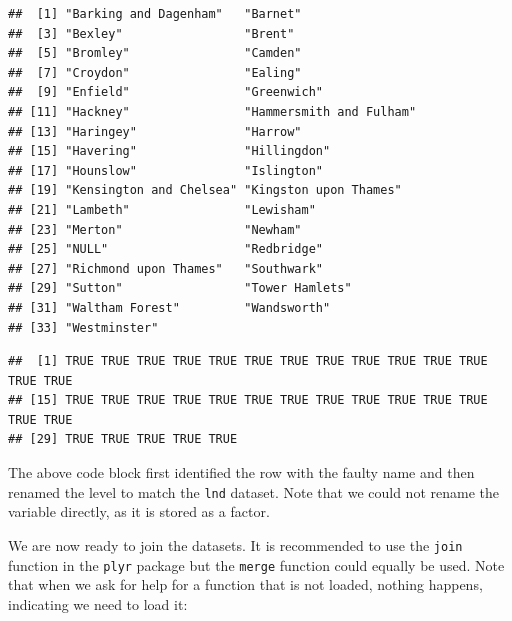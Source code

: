 \documentclass[]{article}
\newenvironment{Shaded}{}{}
\newcommand{\KeywordTok}[1]{\textcolor[rgb]{0.00,0.44,0.13}{\textbf{{#1}}}}
\newcommand{\DecValTok}[1]{\textcolor[rgb]{0.25,0.63,0.44}{{#1}}}
\newcommand{\StringTok}[1]{\textcolor[rgb]{0.25,0.44,0.63}{{#1}}}
\newcommand{\CommentTok}[1]{\textcolor[rgb]{0.38,0.63,0.69}{\textit{{#1}}}}
\newcommand{\NormalTok}[1]{{#1}}
\begin{document}
\begin{verbatim}
##  [1] "Barking and Dagenham"   "Barnet"                
##  [3] "Bexley"                 "Brent"                 
##  [5] "Bromley"                "Camden"                
##  [7] "Croydon"                "Ealing"                
##  [9] "Enfield"                "Greenwich"             
## [11] "Hackney"                "Hammersmith and Fulham"
## [13] "Haringey"               "Harrow"                
## [15] "Havering"               "Hillingdon"            
## [17] "Hounslow"               "Islington"             
## [19] "Kensington and Chelsea" "Kingston upon Thames"  
## [21] "Lambeth"                "Lewisham"              
## [23] "Merton"                 "Newham"                
## [25] "NULL"                   "Redbridge"             
## [27] "Richmond upon Thames"   "Southwark"             
## [29] "Sutton"                 "Tower Hamlets"         
## [31] "Waltham Forest"         "Wandsworth"            
## [33] "Westminster"
\end{verbatim}

\begin{Shaded}
\end{Shaded}

\begin{verbatim}
##  [1] TRUE TRUE TRUE TRUE TRUE TRUE TRUE TRUE TRUE TRUE TRUE TRUE TRUE TRUE
## [15] TRUE TRUE TRUE TRUE TRUE TRUE TRUE TRUE TRUE TRUE TRUE TRUE TRUE TRUE
## [29] TRUE TRUE TRUE TRUE TRUE
\end{verbatim}

The above code block first identified the row with the faulty name and
then renamed the level to match the \texttt{lnd} dataset. Note that we
could not rename the variable directly, as it is stored as a factor.

We are now ready to join the datasets. It is recommended to use the
\texttt{join} function in the \texttt{plyr} package but the
\texttt{merge} function could equally be used. Note that when we ask for
help for a function that is not loaded, nothing happens, indicating we
need to load it:
\end{document}
